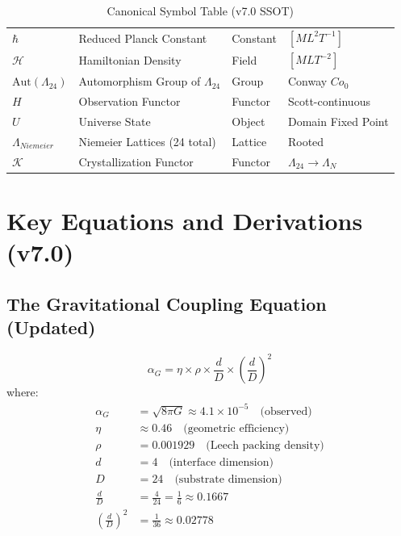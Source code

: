 \documentclass[11pt,titlepage]{article}
\newcommand{\leech}{\Lambda_{24}}
\begin{document}
\begin{table}[h!]
\begin{tabular}{@{}llll@{}}
$\hbar$ & Reduced Planck Constant & Constant & $[M L^2 T^{-1}]$ \\
$\mathcal{H}$ & Hamiltonian Density & Field & $[M L T^{-2}]$ \\
$\text{Aut}(\leech)$ & Automorphism Group of $\leech$ & Group & Conway $Co_0$ \\
$H$ & Observation Functor & Functor & Scott-continuous \\
$U$ & Universe State & Object & Domain Fixed Point \\
$\Lambda_{Niemeier}$ & Niemeier Lattices (24 total) & Lattice & Rooted \\
$\mathcal{K}$ & Crystallization Functor & Functor & $\leech \to \Lambda_N$ \\ \bottomrule
\end{tabular}
\caption{Canonical Symbol Table (v7.0 SSOT)}
\end{table}


\section{Key Equations and Derivations (v7.0)}

\subsection{The Gravitational Coupling Equation (Updated)}

\begin{tcolorbox}[colback=yellow!5!white,colframe=yellow!75!black,title=Central Equation (v7.0)]
\[
\alpha_G = \eta \times \rho \times \frac{d}{D} \times \left(\frac{d}{D}\right)^2
\]
where:
\begin{align*}
\alpha_G &= \sqrt{8\pi G} \approx 4.1\times10^{-5} \quad \text{(observed)} \\
\eta &\approx 0.46 \quad \text{(geometric efficiency)} \\
\rho &= 0.001929 \quad \text{(Leech packing density)} \\
d &= 4 \quad \text{(interface dimension)} \\
D &= 24 \quad \text{(substrate dimension)} \\
\frac{d}{D} &= \frac{4}{24} = \frac{1}{6} \approx 0.1667 \\
\left(\frac{d}{D}\right)^2 &= \frac{1}{36} \approx 0.02778
\end{align*}
\end{tcolorbox}
\end{document}

